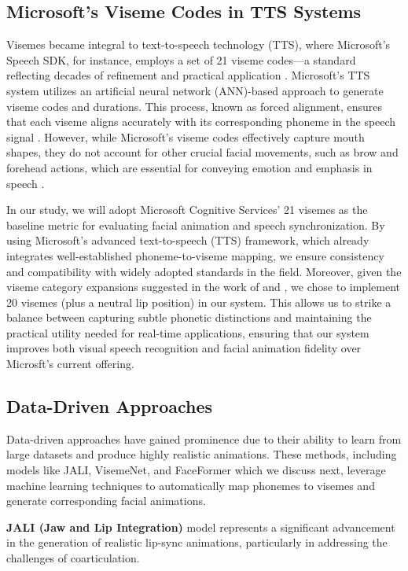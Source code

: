 \documentclass[12pt]{article}
\begin{document}
\subsection{Microsoft's Viseme Codes in TTS Systems}
\label{sec:mstts}
Visemes became integral to text-to-speech technology (TTS), where Microsoft’s Speech SDK, for instance, employs a set of 21 viseme codes—a standard reflecting decades of refinement and practical application \cite{MicrosoftSpeechService}. Microsoft's TTS system utilizes an artificial neural network (ANN)-based approach to generate viseme codes and durations. This process, known as forced alignment, ensures that each viseme aligns accurately with its corresponding phoneme in the speech signal \cite{Xu213}. However, while Microsoft’s viseme codes effectively capture mouth shapes, they do not account for other crucial facial movements, such as brow and forehead actions, which are essential for conveying emotion and emphasis in speech \cite{Massaro1998}.

In our study, we will adopt Microsoft Cognitive Services' 21  visemes  as the baseline metric for evaluating facial animation and speech synchronization. By using Microsoft’s advanced text-to-speech (TTS) framework, which already integrates well-established phoneme-to-viseme mapping, we ensure consistency and compatibility with widely adopted standards in the field. Moreover, given the viseme category expansions suggested in the work of \cite{Xu213} and \cite{cappelletta2012} , we chose to implement 20 visemes (plus a neutral lip position) in our system. This allows us to strike a balance between capturing subtle phonetic distinctions and maintaining the practical utility needed for real-time applications, ensuring that our system improves both visual speech recognition and facial animation fidelity over Microsft's current offering.

\subsection{Data-Driven Approaches}
Data-driven approaches have gained prominence due to their ability to learn from large datasets and produce highly realistic animations. These methods,   including models like JALI, VisemeNet, and FaceFormer which we discuss next, 
leverage machine learning techniques to automatically map phonemes to visemes and generate corresponding facial animations.

{\bf JALI (Jaw and Lip Integration)} model  \cite{Edwards2016}  represents a significant advancement in the generation of realistic lip-sync animations, particularly in addressing the challenges of coarticulation.
\end{document}
